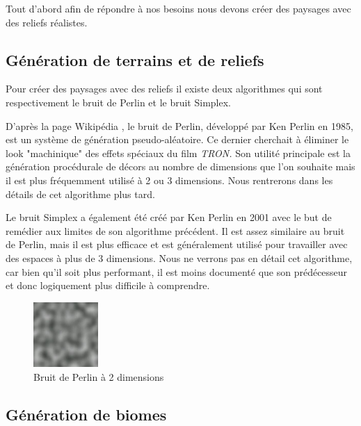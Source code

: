 \documentclass{article}
\begin{document}
Tout d'abord afin de répondre à nos besoins nous devons créer des paysages avec des reliefs réalistes.

\subsection{Génération de terrains et de reliefs}

Pour créer des paysages avec des reliefs il existe deux algorithmes qui sont respectivement le bruit de Perlin et le bruit Simplex.

D'après la page Wikipédia \cite{perlin}, le bruit de Perlin, développé par Ken Perlin en 1985, est un système de génération pseudo-aléatoire. Ce dernier cherchait à éliminer le look "machinique" des effets spéciaux du film \textit{TRON.} Son utilité principale est la génération procédurale de décors au nombre de dimensions que l'on souhaite mais il est plus fréquemment utilisé à 2 ou 3 dimensions. Nous rentrerons dans les détails de cet algorithme plus tard.\par
Le bruit Simplex \cite{simplex_noise} a également été créé par Ken Perlin en 2001 avec le but de remédier aux limites de son algorithme précédent. Il est assez similaire au bruit de Perlin, mais il est plus efficace et est généralement utilisé pour travailler avec des espaces à plus de 3 dimensions. Nous ne verrons pas en détail cet algorithme, car bien qu'il soit plus performant, il est moins documenté que son prédécesseur et donc logiquement plus difficile à comprendre.
\begin{figure} %
  \centering
  \includegraphics[width=0.22\textwidth]{assets/Perlin_noise.jpg}
  \caption{Bruit de Perlin à 2 dimensions}
  \label{perlin}
\end{figure}

\subsection{Génération de biomes}
\end{document}
